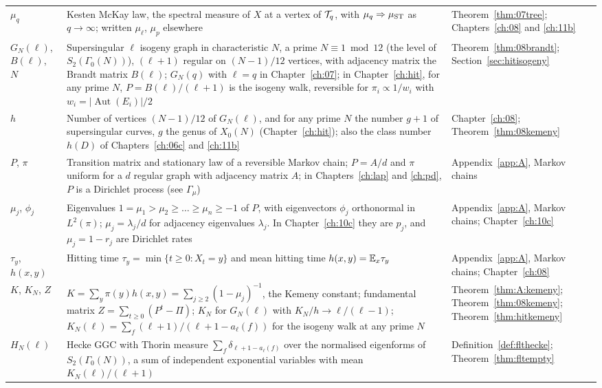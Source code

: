 {\begin{longtable}{p{0.8in}p{2.65in}p{0.95in}}
\raggedright $\mu_q$ & \raggedright Kesten McKay law, the spectral measure of $X$ at a vertex of $\mathcal{T}_q$, with $\mu_q\Rightarrow\mu_{\mathrm{ST}}$ as $q\to\infty$; written $\mu_\ell$, $\mu_p$ elsewhere & \raggedright Theorem~\ref{thm:07tree}; Chapters~\ref{ch:08} and \ref{ch:11b}\tabularnewline[1pt]
\raggedright $G_N(\ell)$, $B(\ell)$, $N$ & \raggedright Supersingular $\ell$ isogeny graph in characteristic $N$, a prime $N\equiv1\bmod12$ (the level of $S_2(\Gamma_0(N))$), $(\ell+1)$ regular on $(N-1)/12$ vertices, with adjacency matrix the Brandt matrix $B(\ell)$; $G_N(q)$ with $\ell=q$ in Chapter~\ref{ch:07}; in Chapter~\ref{ch:hit}, for any prime $N$, $P=B(\ell)/(\ell+1)$ is the isogeny walk, reversible for $\pi_i\propto1/w_i$ with $w_i=|\operatorname{Aut}(E_i)|/2$ & \raggedright Theorem~\ref{thm:08brandt}; Section~\ref{sec:hitisogeny}\tabularnewline[1pt]
\raggedright $h$ & \raggedright Number of vertices $(N-1)/12$ of $G_N(\ell)$, and for any prime $N$ the number $g+1$ of supersingular curves, $g$ the genus of $X_0(N)$ (Chapter~\ref{ch:hit}); also the class number $h(D)$ of Chapters~\ref{ch:06c} and \ref{ch:11b} & \raggedright Chapter~\ref{ch:08}; Theorem~\ref{thm:08kemeny}\tabularnewline[1pt]
\raggedright $P$, $\pi$ & \raggedright Transition matrix and stationary law of a reversible Markov chain; $P=A/d$ and $\pi$ uniform for a $d$ regular graph with adjacency matrix $A$; in Chapters~\ref{ch:lap} and \ref{ch:pd}, $P$ is a Dirichlet process (see $\Gamma_\mu$) & \raggedright Appendix~\ref{app:A}, Markov chains\tabularnewline[1pt]
\raggedright $\mu_j$, $\phi_j$ & \raggedright Eigenvalues $1=\mu_1>\mu_2\ge\dots\ge\mu_n\ge-1$ of $P$, with eigenvectors $\phi_j$ orthonormal in $L^2(\pi)$; $\mu_j=\lambda_j/d$ for adjacency eigenvalues $\lambda_j$. In Chapter~\ref{ch:10c} they are $p_j$, and $\mu_j=1-r_j$ are Dirichlet rates & \raggedright Appendix~\ref{app:A}, Markov chains; Chapter~\ref{ch:10c}\tabularnewline[1pt]
\raggedright $\tau_y$, $h(x,y)$ & \raggedright Hitting time $\tau_y=\min\{t\ge0:X_t=y\}$ and mean hitting time $h(x,y)=\mathbb{E}_x\tau_y$ & \raggedright Appendix~\ref{app:A}, Markov chains; Chapter~\ref{ch:08}\tabularnewline[1pt]
\raggedright $K$, $K_N$, $Z$ & \raggedright $K=\sum_y\pi(y)h(x,y)=\sum_{j\ge2}(1-\mu_j)^{-1}$, the Kemeny constant; fundamental matrix $Z=\sum_{t\ge0}(P^t-\Pi)$; $K_N$ for $G_N(\ell)$ with $K_N/h\to\ell/(\ell-1)$; $K_N(\ell)=\sum_f(\ell+1)/(\ell+1-a_\ell(f))$ for the isogeny walk at any prime $N$ & \raggedright Theorem~\ref{thm:A:kemeny}; Theorem~\ref{thm:08kemeny}; Theorem~\ref{thm:hitkemeny}\tabularnewline[1pt]
\raggedright $H_N(\ell)$ & \raggedright Hecke GGC with Thorin measure $\sum_f\delta_{\ell+1-a_\ell(f)}$ over the normalised eigenforms of $S_2(\Gamma_0(N))$, a sum of independent exponential variables with mean $K_N(\ell)/(\ell+1)$ & \raggedright Definition~\ref{def:flthecke}; Theorem~\ref{thm:fltempty}\tabularnewline[1pt]

\end{longtable}}
